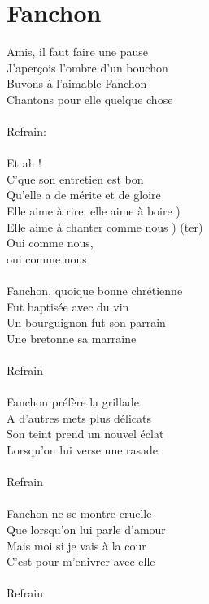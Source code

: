 \section*{Fanchon}
Amis, il faut faire une pause\\
J'aperçois l'ombre d'un bouchon\\
Buvons à l'aimable Fanchon\\
Chantons pour elle quelque chose\\
\\
Refrain:\\
\\
Et ah !\\
C'que son entretien est bon\\
Qu'elle a de mérite et de gloire\\
Elle aime à rire, elle aime à boire )\\
Elle aime à chanter comme nous ) (ter)\\
Oui comme nous,\\
oui comme nous\\
\\
Fanchon, quoique bonne chrétienne\\
Fut baptisée avec du vin\\
Un bourguignon fut son parrain\\
Une bretonne sa marraine\\
\\
Refrain\\
\\
Fanchon préfère la grillade\\
A d'autres mets plus délicats\\
Son teint prend un nouvel éclat\\
Lorsqu'on lui verse une rasade\\
\\
Refrain\\
\\
Fanchon ne se montre cruelle\\
Que lorsqu'on lui parle d'amour\\
Mais moi si je vais à la cour\\
C'est pour m'enivrer avec elle\\
\\
Refrain